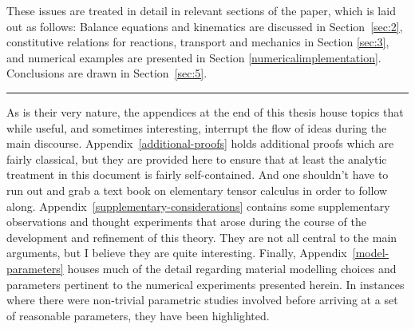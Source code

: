 These issues are treated in detail in relevant sections of the paper,
which is laid out as follows: Balance equations and kinematics are
discussed in Section~\ref{sec:2}, constitutive relations for
reactions, transport and mechanics in Section \ref{sec:3}, and
numerical examples are presented in Section
\ref{numericalimplementation}. Conclusions are drawn in
Section~\ref{sec:5}.

\hrule

As is their very nature, the appendices at the end of this thesis
house topics that while useful, and sometimes interesting, interrupt
the flow of ideas during the main
discourse. Appendix~\ref{additional-proofs} holds additional proofs
which are fairly classical, but they are provided here to ensure that
at least the analytic treatment in this document is fairly
self-contained. And one shouldn't have to run out and grab a text book
on elementary tensor calculus in order to follow
along. Appendix~\ref{supplementary-considerations} contains some
supplementary observations and thought experiments that arose during
the course of the development and refinement of this theory. They are
not all central to the main arguments, but I believe they are quite
interesting. Finally, Appendix~\ref{model-parameters} houses much of
the detail regarding material modelling choices and parameters
pertinent to the numerical experiments presented herein. In instances
where there were non-trivial parametric studies involved before
arriving at a set of reasonable parameters, they have been
highlighted.

%

